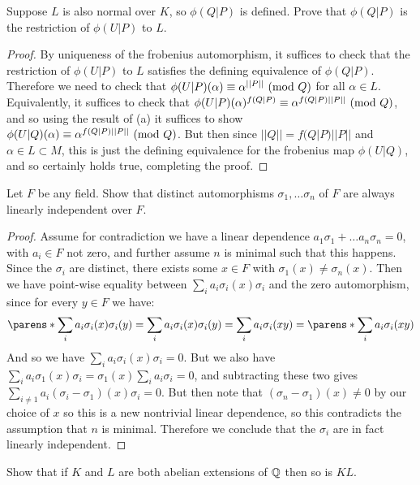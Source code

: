 \documentclass[11pt]{article}
\begin{document}
Suppose $L$ is also normal over $K$, so $\phi(Q|P)$ is defined.
Prove that $\phi(Q|P)$ is the restriction of $\phi(U|P)$ to $L$.
\begin{proof}
  By uniqueness of the frobenius automorphism, it suffices to check that the restriction of $\phi(U|P)$ to $L$ satisfies the defining equivalence of $\phi(Q|P)$.
  Therefore we need to check that $\phi(U|P)(\alpha) \equiv \alpha^{||P||}\ (\text{mod}\ Q)$ for all $\alpha \in L$.
  Equivalently, it suffices to check that $\phi(U|P)(\alpha)^{f(Q|P)} \equiv \alpha^{f(Q|P)||P||}\ (\text{mod}\ Q)$, and so using the result of (a) it suffices to show $\phi(U|Q)(\alpha) \equiv \alpha^{f(Q|P)||P||}\ (\text{mod}\ Q)$.
  But then since $||Q|| = f(Q|P)||P||$ and $\alpha \in L \subset M$, this is just the defining equivalence for the frobenius map $\phi(U|Q)$, and so certainly holds true, completing the proof.
\end{proof}


Let $F$ be any field. Show that distinct automorphisms $\sigma_1, \dots \sigma_n$ of $F$ are always linearly independent over $F$.

\begin{proof}
  Assume for contradiction we have a linear dependence $a_1\sigma_1 + \dots a_n\sigma_n = 0$, with $a_i \in F$ not zero, and further assume $n$ is minimal such that this happens.
  Since the $\sigma_i$ are distinct, there exists some $x \in F$ with $\sigma_1(x) \ne \sigma_n(x)$.
  Then we have point-wise equality between $\sum_i a_i \sigma_i(x) \sigma_i$ and the zero automorphism, since for every $y \in F$ we have:
  \begin{equation*}
    \parens*{\sum_i a_i \sigma_i(x) \sigma_i}(y)
    = \sum_i a_i \sigma_i(x) \sigma_i(y)
    = \sum_i a_i \sigma_i(xy)
    = \parens*{\sum_i a_i \sigma_i}(xy)
  \end{equation*}
  And so we have $\sum_i a_i \sigma_i(x) \sigma_i = 0$.
  But we also have $\sum_i a_i \sigma_1(x) \sigma_i = \sigma_1(x) \sum_i a_i \sigma_i = 0$, and subtracting these two gives $\sum_{i \ne 1} a_i (\sigma_i - \sigma_1)(x) \sigma_i = 0$.
  But then note that $(\sigma_n - \sigma_1)(x) \ne 0$ by our choice of $x$ so this is a new nontrivial linear dependence, so this contradicts the assumption that $n$ is minimal.
  Therefore we conclude that the $\sigma_i$ are in fact linearly independent.
\end{proof}


Show that if $K$ and $L$ are both abelian extensions of $\mathbb{Q}$ then so is $KL$.
\end{document}
